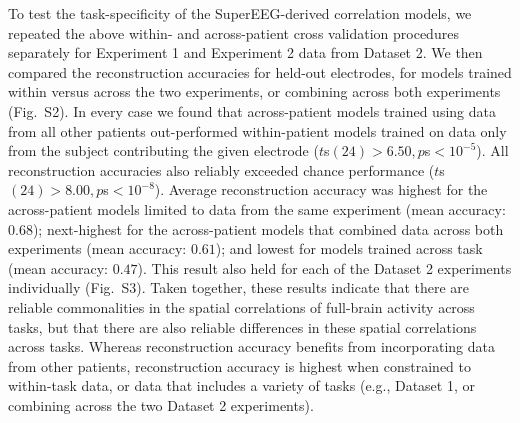 \documentclass[11pt]{article}
\newcommand{\perexptaskrecon}{S2}
\newcommand{\perexptaskreconseparated}{S3}
\begin{document}
To test the task-specificity of the SuperEEG-derived correlation
models, we repeated the above within- and across-patient cross validation
procedures separately for Experiment 1 and Experiment 2 data from
Dataset 2.  We then compared the reconstruction accuracies for held-out
electrodes, for models trained within versus across the two
experiments, or combining across both experiments
(Fig.~\perexptaskrecon).  In every case we found that across-patient
models trained using data from all other patients out-performed
within-patient models trained on data only from the subject
contributing the given electrode ($t$s$(24) > 6.50, p$s$ < 10^{-5}$).  All
reconstruction accuracies also reliably exceeded chance performance
($t$s$(24) > 8.00, p$s$ < 10^{-8}$).  Average reconstruction accuracy was
highest for the across-patient models limited to data from the same
experiment (mean accuracy: $0.68$); next-highest for the
across-patient models that combined data across both experiments (mean
accuracy: $0.61$); and lowest for models trained across task (mean
accuracy: $0.47$).  This result also held for each of the Dataset 2
experiments individually (Fig.~\perexptaskreconseparated).  Taken
together, these results indicate that there are reliable commonalities
in the spatial correlations of full-brain activity across tasks, but
that there are also reliable differences in these spatial correlations
across tasks.  Whereas reconstruction accuracy benefits from
incorporating data from other patients, reconstruction accuracy is
highest when constrained to within-task data, or data that includes a
variety of tasks (e.g., Dataset 1, or combining across the two Dataset
2 experiments).
\end{document}
